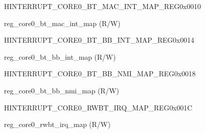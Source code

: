 \begin{register}{H}{INTERRUPT\_CORE0\_BT\_MAC\_INT\_MAP\_REG}{0x0010}\label{regdesc:INTERRUPTCORE0BTMACINTMAPREG}
%
%
\regnewline%
\begin{regdesc}\begin{reglist}
\label{fielddesc:INTERRUPTCORE0BTMACINTMAP}\item [INTERRUPT\_CORE0\_BT\_MAC\_INT\_MAP] reg\_core0\_bt\_mac\_int\_map (R/W)
\end{reglist}\end{regdesc}
\end{register}


\begin{register}{H}{INTERRUPT\_CORE0\_BT\_BB\_INT\_MAP\_REG}{0x0014}\label{regdesc:INTERRUPTCORE0BTBBINTMAPREG}
%
%
\regnewline%
\begin{regdesc}\begin{reglist}
\label{fielddesc:INTERRUPTCORE0BTBBINTMAP}\item [INTERRUPT\_CORE0\_BT\_BB\_INT\_MAP] reg\_core0\_bt\_bb\_int\_map (R/W)
\end{reglist}\end{regdesc}
\end{register}


\begin{register}{H}{INTERRUPT\_CORE0\_BT\_BB\_NMI\_MAP\_REG}{0x0018}\label{regdesc:INTERRUPTCORE0BTBBNMIMAPREG}
%
%
\regnewline%
\begin{regdesc}\begin{reglist}
\label{fielddesc:INTERRUPTCORE0BTBBNMIMAP}\item [INTERRUPT\_CORE0\_BT\_BB\_NMI\_MAP] reg\_core0\_bt\_bb\_nmi\_map (R/W)
\end{reglist}\end{regdesc}
\end{register}


\begin{register}{H}{INTERRUPT\_CORE0\_RWBT\_IRQ\_MAP\_REG}{0x001C}\label{regdesc:INTERRUPTCORE0RWBTIRQMAPREG}
%
%
\regnewline%
\begin{regdesc}\begin{reglist}
\label{fielddesc:INTERRUPTCORE0RWBTIRQMAP}\item [INTERRUPT\_CORE0\_RWBT\_IRQ\_MAP] reg\_core0\_rwbt\_irq\_map (R/W)
\end{reglist}\end{regdesc}
\end{register}


